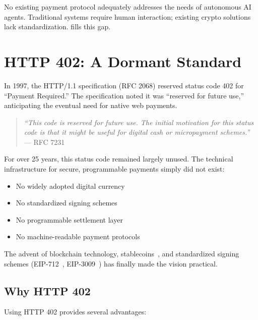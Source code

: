 \begin{warningbox}
No existing payment protocol adequately addresses the needs of autonomous AI agents. Traditional systems require human interaction; existing crypto solutions lack standardization. \tprotocol{} fills this gap.
\end{warningbox}

\section{HTTP 402: A Dormant Standard}
\label{sec:http402}

In 1997, the HTTP/1.1 specification (RFC 2068) reserved status code 402 for ``Payment Required.'' The specification noted it was ``reserved for future use,'' anticipating the eventual need for native web payments.

\begin{quote}
\textit{``This code is reserved for future use. The initial motivation for this status code is that it might be useful for digital cash or micropayment schemes.''} --- RFC 7231 \cite{rfc7231}
\end{quote}

For over 25 years, this status code remained largely unused. The technical infrastructure for secure, programmable payments simply did not exist:

\begin{itemize}
    \item No widely adopted digital currency
    \item No standardized signing schemes
    \item No programmable settlement layer
    \item No machine-readable payment protocols
\end{itemize}

The advent of blockchain technology, stablecoins~\cite{usdt}, and standardized signing schemes (EIP-712~\cite{eip712}, EIP-3009~\cite{eip3009}) has finally made the vision practical.

\subsection{Why HTTP 402}

Using HTTP 402 provides several advantages:

